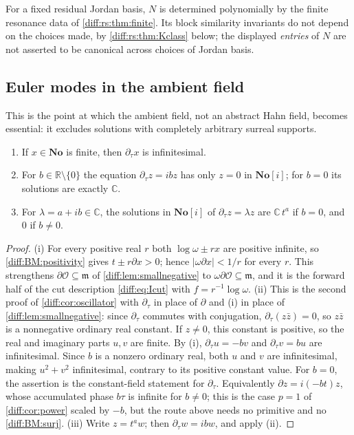 \documentclass[11pt,letterpaper]{article}
\numberwithin{equation}{section}
\theoremstyle{definition}
\theoremstyle{remark}
\newcommand{\No}{\mathbf{No}}
\newcommand{\SC}{\mathbf{No}[i]}
\newcommand{\R}{\mathbb R}
\newcommand{\C}{\mathbb C}
\newcommand{\der}{\partial}
\newcommand{\Ofin}{\mathcal O}
\newcommand{\mm}{\mathfrak m}
\newcommand{\abs}[1]{\lvert#1\rvert}
\newcommand{\derT}{\der_{\tau}}
\begin{document}
For a fixed residual Jordan basis, $N$ is determined polynomially by the
finite resonance data of \cref{diff:rs:thm:finite}. Its block similarity
invariants do not depend on the choices made, by \cref{diff:rs:thm:Kclass}
below; the displayed \emph{entries} of $N$ are not asserted to be canonical
across choices of Jordan basis.

\subsection{Euler modes in the ambient field}
\label{diff:rs:sub:eulermodes}

This is the point at which the ambient field, not an abstract Hahn field,
becomes essential: it excludes solutions with completely arbitrary surreal
supports.

\begin{lemma}
\label{diff:rs:lem:eulermode}
\begin{enumerate}[label=\textup{(\roman*)},leftmargin=2.4em]
\item If $x\in\No$ is finite, then $\derT x$ is infinitesimal.
\item For $b\in\R\setminus\{0\}$ the equation $\derT z=ibz$ has only $z=0$ in
$\SC$; for $b=0$ its solutions are exactly $\C$.
\item For $\lambda=a+ib\in\C$, the solutions in $\SC$ of $\derT z=\lambda z$
are $\C\,t^{a}$ if $b=0$, and $0$ if $b\neq0$.
\end{enumerate}
\end{lemma}
\begin{proof}
(i) For every positive real $r$ both $\log\omega\pm rx$ are positive infinite,
so \ref{diff:BM:positivity} gives $t\pm r\der x>0$; hence
$\abs{\omega\der x}<1/r$ for every $r$. This strengthens
$\der\Ofin\subseteq\mm$ of \cref{diff:lem:smallnegative} to
$\omega\der\Ofin\subseteq\mm$, and it is the forward half of the cut
description \cref{diff:eq:Icut} with $f=r^{-1}\log\omega$.
(ii) This is the second proof of \cref{diff:cor:oscillator} with $\derT$ in
place of $\der$ and (i) in place of \cref{diff:lem:smallnegative}: since
$\derT$ commutes with conjugation, $\derT(z\bar z)=0$, so $z\bar z$ is a
nonnegative ordinary real constant. If $z\neq0$, this constant is
positive, so the real and imaginary parts $u,v$ are finite. By (i),
$\derT u=-bv$ and $\derT v=bu$ are infinitesimal. Since $b$ is a
nonzero ordinary real, both $u$ and $v$ are infinitesimal, making
$u^{2}+v^{2}$ infinitesimal, contrary to its positive constant value.
For $b=0$, the assertion is the constant-field statement for $\derT$. Equivalently $\der z=i(-bt)z$, whose accumulated phase
$b\tau$ is infinite for $b\neq0$; this is the case $p=1$ of
\cref{diff:cor:power} scaled by $-b$, but the route above needs no primitive
and no \ref{diff:BM:surj}.
(iii) Write $z=t^{a}w$; then $\derT w=ibw$, and apply (ii).
\end{proof}
\end{document}
